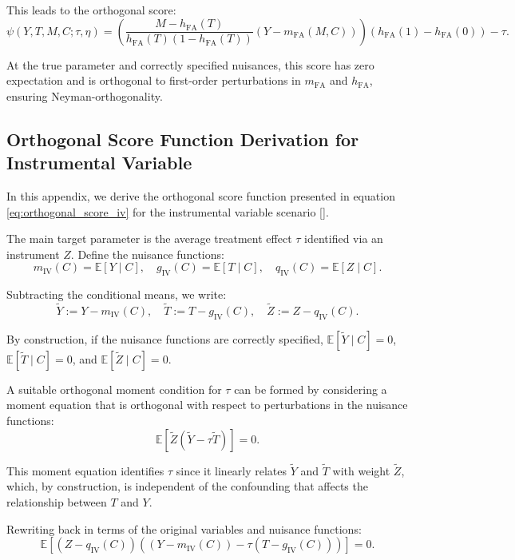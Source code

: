 \documentclass{article}
\numberwithin{equation}{section}
\begin{document}
This leads to the orthogonal score:
\[
\psi(Y, T, M, C; \tau, \eta) 
= \left(\frac{M - h_{\text{FA}}(T)}{h_{\text{FA}}(T)(1 - h_{\text{FA}}(T))}(Y - m_{\text{FA}}(M, C))\right)(h_{\text{FA}}(1) - h_{\text{FA}}(0)) - \tau.
\]

At the true parameter and correctly specified nuisances, this score has zero expectation and is orthogonal to first-order perturbations in \(m_{\text{FA}}\) and \(h_{\text{FA}}\), ensuring Neyman-orthogonality.

\newpage
\subsection{Orthogonal Score Function Derivation for Instrumental Variable}
\label{subsec:appendix_orthogonal_score_function_instrumental_variable}

In this appendix, we derive the orthogonal score function presented in equation \eqref{eq:orthogonal_score_iv} for the instrumental variable scenario [\cite{BelloniChernozhukovHansen2014, ChernozhukovChetverikovDemireretal2018, Pearl2009}].

The main target parameter is the average treatment effect \(\tau\) identified via an instrument \(Z\). Define the nuisance functions:
\[
m_{\text{IV}}(C) = \mathbb{E}[Y \mid C], \quad
g_{\text{IV}}(C) = \mathbb{E}[T \mid C], \quad
q_{\text{IV}}(C) = \mathbb{E}[Z \mid C].
\]

Subtracting the conditional means, we write:
\[
\tilde{Y} := Y - m_{\text{IV}}(C), \quad
\tilde{T} := T - g_{\text{IV}}(C), \quad
\tilde{Z} := Z - q_{\text{IV}}(C).
\]

By construction, if the nuisance functions are correctly specified, \(\mathbb{E}[\tilde{Y} \mid C] = 0\), \(\mathbb{E}[\tilde{T} \mid C] = 0\), and \(\mathbb{E}[\tilde{Z} \mid C] = 0\).

A suitable orthogonal moment condition for \(\tau\) can be formed by considering a moment equation that is orthogonal with respect to perturbations in the nuisance functions:
\[
\mathbb{E}[\tilde{Z}(\tilde{Y} - \tau \tilde{T})] = 0.
\]

This moment equation identifies \(\tau\) since it linearly relates \(\tilde{Y}\) and \(\tilde{T}\) with weight \(\tilde{Z}\), which, by construction, is independent of the confounding that affects the relationship between \(T\) and \(Y\).

Rewriting back in terms of the original variables and nuisance functions:
\[
\mathbb{E}[(Z - q_{\text{IV}}(C))((Y - m_{\text{IV}}(C)) - \tau (T - g_{\text{IV}}(C)))] = 0.
\]
\end{document}
